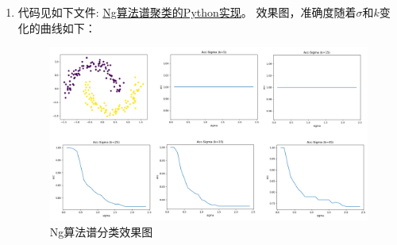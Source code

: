 \documentclass[a4paper,11pt,onecolumn,oneside,UTF8]{article}
\begin{document}
\begin{enumerate}
      \item
            代码见如下文件:
            \href{https://github.com/Allenem/PatternRecognition/blob/main/hw5/hw5_spectral_cluster.py}{Ng算法谱聚类的Python实现}。
            效果图，准确度随着$\sigma$和$k$变化的曲线如下：\\
            \begin{figure}[H]
                  \centering
                  \includegraphics[width=.8\textwidth]{hw5_4.png}
                  \caption{ Ng算法谱分类效果图 }
                  \label{img4}
            \end{figure}
\end{enumerate}
\end{document}
